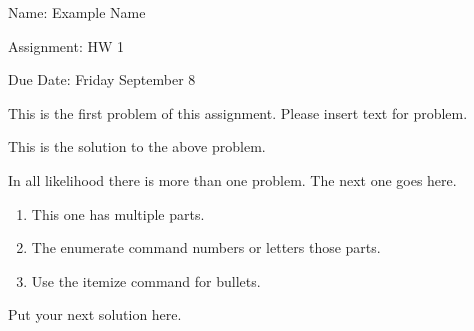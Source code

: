 \documentclass[11 pt]{article}
\begin{document}
    Name: Example Name

    Assignment: HW 1 

    Due Date: Friday September 8
    \hfill \break %
    \begin{problem}
        This is the first problem of this assignment. Please insert text for problem.
    \end{problem}

    \begin{solution}
        This is the solution to the above problem. 
    \end{solution}
    
    \pagebreak %

    \begin{problem}
        In all likelihood there is more than one problem. The next one goes here.
        \begin{enumerate}
            \item This one has multiple parts.
            \item The enumerate command numbers or letters those parts.
            \item Use the itemize command for bullets.
        \end{enumerate}
    \end{problem}

    \begin{solution}
        Put your next solution here.
    \end{solution}

    \pagebreak

    
\end{document}
